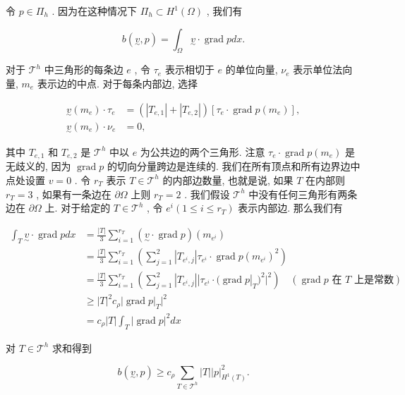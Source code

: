 令 $p \in \varPi_{h}$ . 因为在这种情况下 $\varPi_{h} \subset H^{1}(\Omega)$ , 我们有

$$
b(\underset{\sim}{v},p) = \int_{\Omega} \underset{\sim}{v} \cdot \operatorname{grad}p dx.
$$

对于 $\mathcal{T}^{h}$ 中三角形的每条边 $e$ , 令 $\tau_{e}$ 表示相切于 $e$ 的单位向量, $\nu_{e}$ 表示单位法向量, $m_{e}$ 表示边的中点. 对于每条内部边, 选择

\begin{align*}
\underset{\sim}{v}(m_{e}) \cdot \tau_{e} &= (|T_{e,1}| + |T_{e,2}|) [\tau_{e} \cdot \operatorname{grad}p(m_{e})], \\
\underset{\sim}{v}(m_{e}) \cdot \nu_{e} &= 0,
\end{align*}

其中 $T_{e,1}$ 和 $T_{e,2}$ 是 $\mathcal{T}^{h}$ 中以 $e$ 为公共边的两个三角形. 注意 $\tau_{e} \cdot \operatorname{grad}p(m_{e})$ 是无歧义的, 因为 $\operatorname{grad}p$ 的切向分量跨边是连续的. 我们在所有顶点和所有边界边中点处设置 $v = 0$ . 令 $r_{T}$ 表示 $T \in \mathcal{T}^{h}$ 的内部边数量, 也就是说, 如果 $T$ 在内部则 $r_{T} = 3$ , 如果有一条边在 $\partial \Omega$ 上则 $r_{T} = 2$ . 我们假设 $\mathcal{T}^{h}$ 中没有任何三角形有两条边在 $\partial \Omega$ 上. 对于给定的 $T \in \mathcal{T}^{h}$ , 令 $e^{i} (1 \leq i \leq r_{T})$ 表示内部边. 那么我们有

\begin{align*}
\int_{T} \underset{\sim}{v} \cdot \operatorname{grad}p dx &= \frac{|T|}{3} \sum_{i = 1}^{r_{T}} (\underset{\sim}{v} \cdot \operatorname{grad}p)(m_{e^{i}}) \\
&= \frac{|T|}{3} \sum_{i = 1}^{r_{T}} \left( \sum_{j = 1}^{2} |T_{e^{i},j}| \tau_{e^{i}} \cdot \operatorname{grad}p(m_{e^{i}})^{2} \right) \\
&= \frac{|T|}{3} \sum_{i = 1}^{r_{T}} \left( \sum_{j = 1}^{2} |T_{e^{i},j}| |\tau_{e^{i}} \cdot (\operatorname{grad}p|_{T})^{2}|^{2} \right) \quad (\operatorname{grad}p \text{ 在 } T \text{ 上是常数}) \\
&\geq |T|^{2} c_{\rho} |\operatorname{grad}p|_{T}|^{2} \\
&= c_{\rho} |T| \int_{T} |\operatorname{grad}p|^{2} dx
\end{align*}

对 $T \in \mathcal{T}^{h}$ 求和得到

\begin{equation}\label{eq:12.6.1}
b(\underset{\sim}{v},p) \geq c_{\rho} \sum_{T \in \mathcal{T}^{h}} |T| |p|_{H^{1}(T)}^{2}.
\end{equation}

